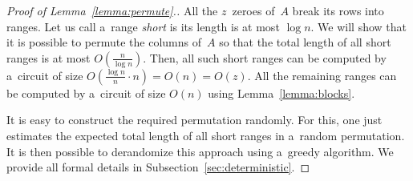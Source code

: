 \documentclass[a4paper,UKenglish,cleveref, autoref]{lipics-v2019}
\begin{document}
\begin{proof}[Proof of Lemma~\ref{lemma:permute}.]
All the $z$~zeroes of~$A$ break its rows into ranges.
Let us call a~range {\em short} is its length is at most $\log n$.
We will show that it is possible to permute the columns of~$A$
so that the total length of all short ranges is at most $O(\frac{n}{\log n})$. Then, all such short ranges can be computed by a~circuit of size $O(\frac{\log n}{n} \cdot n)=O(n)=O(z)$.
All the remaining ranges can be computed by a~circuit of size $O(n)$ using Lemma~\ref{lemma:blocks}.

It is easy to construct the required permutation randomly. For this, one just 
estimates the expected total length of all short ranges in a~random permutation. It is then possible to derandomize this approach using a~greedy algorithm. We provide all formal details in Subsection~\ref{sec:deterministic}.
%
%
\end{proof}
\end{document}
